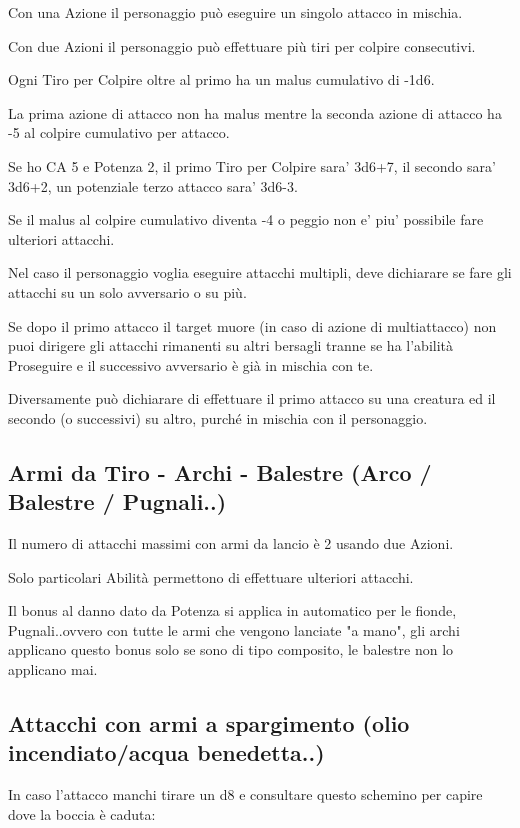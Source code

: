 \documentclass[a4paper,11pt,twoside,openany]{book}
\begin{document}
Con una Azione il personaggio può eseguire un singolo attacco in mischia.

Con due Azioni il personaggio può effettuare più tiri per colpire consecutivi.

Ogni Tiro per Colpire oltre al primo ha un malus cumulativo di -1d6.

La prima azione di attacco non ha malus mentre la seconda azione di attacco ha -5 al colpire cumulativo per attacco.

Se ho CA 5 e Potenza 2, il primo Tiro per Colpire sara' 3d6+7, il secondo sara' 3d6+2,  un potenziale terzo attacco sara' 3d6-3.

Se il malus al colpire cumulativo diventa -4 o peggio non e' piu' possibile fare ulteriori attacchi.

Nel caso il personaggio voglia eseguire attacchi multipli, deve dichiarare se fare gli attacchi su un solo avversario o su più.

Se dopo il primo attacco il target muore (in caso di azione di multiattacco) non puoi dirigere gli attacchi rimanenti su altri bersagli tranne se ha l'abilità Proseguire e il successivo avversario è già in mischia con te.

Diversamente può dichiarare di effettuare il primo attacco su una creatura ed il secondo (o successivi) su altro, purché in mischia con il personaggio.

\subsection{Armi da Tiro - Archi - Balestre (Arco / Balestre / Pugnali..)}

Il numero di attacchi massimi con armi da lancio è 2 usando due Azioni.

Solo particolari Abilità permettono di effettuare ulteriori attacchi.

Il bonus al danno dato da Potenza si applica in automatico per le fionde, Pugnali..ovvero con tutte le armi che vengono lanciate "a mano", gli archi applicano questo bonus solo se sono di tipo composito, le balestre non lo applicano mai.

\subsection{Attacchi con armi a spargimento (olio incendiato/acqua benedetta..)}

In caso l'attacco manchi tirare un d8 e consultare questo schemino per capire dove la boccia è caduta:
\end{document}

